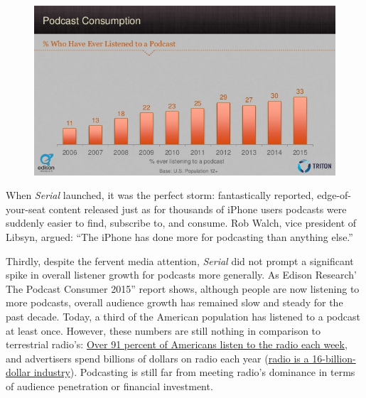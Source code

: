 \documentclass[notoc, symmetric, nobib, nols]{towcenter-guideto-book}
\begin{document}
\begin{figure}
\begin{centering}
\includegraphics[width=.9\textwidth]{graphics/PODCAST15_EdPCconsumer_listened.jpg}
\caption{}
\end{centering}
\end{figure}

When \textit{Serial} launched, it was the perfect storm: fantastically reported, edge-of-your-seat content released just as for thousands of iPhone users podcasts were suddenly easier to find, subscribe to, and consume. Rob Walch, vice president of Libsyn, argued: ``The iPhone has done more for podcasting than anything else.''\autocite{Walch}

Thirdly, despite the fervent media attention, \textit{Serial} did not prompt a significant spike in overall listener growth for podcasts more generally. As Edison Research' The Podcast Consumer 2015'' report shows, although people are now listening to more podcasts, overall audience growth has remained slow and steady for the past decade. Today, a third of the American population has listened to a podcast at least once.\autocite{EdPCconsumer} However, these numbers are still nothing in comparison to terrestrial radio's: \href{http://www.nielsen.com/us/en/insights/reports/2015/state-of-the-media-audio-today-how-america-listens.html}{Over 91 percent of Americans listen to the radio each week}, and advertisers spend billions of dollars on radio each year (\href{http://www.statista.com/topics/1330/radio/}{radio is a 16-billion-dollar industry}).\autocites{nielsenradio, statistaradio} Podcasting is still far from meeting radio's dominance in terms of audience penetration or financial investment.
\end{document}
